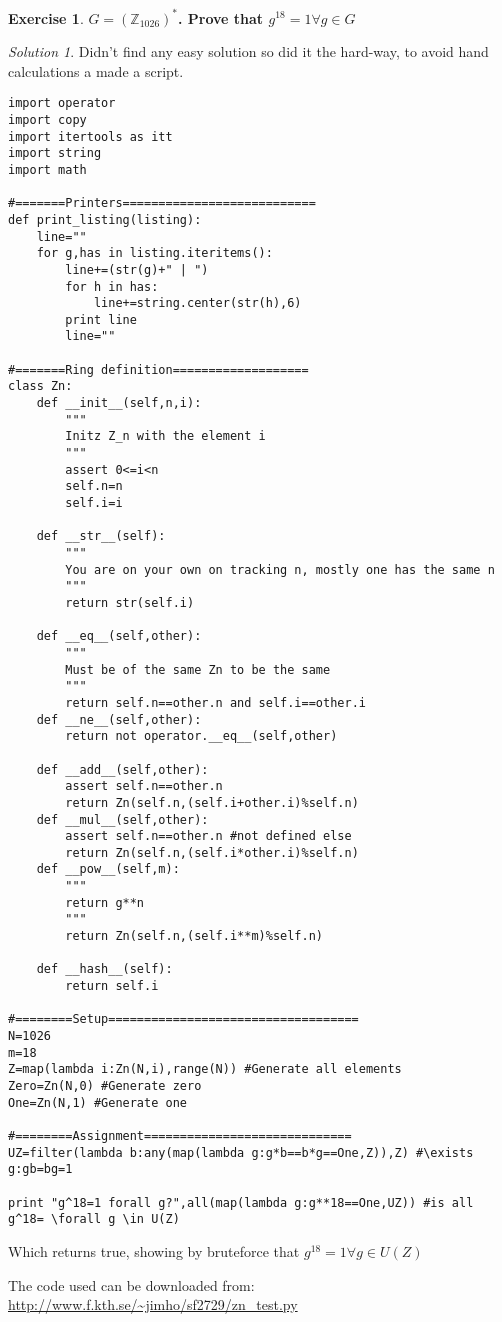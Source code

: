 \documentclass[a4paper,twoside=false,abstract=false,numbers=noenddot,
titlepage=false,headings=small,parskip=half,version=last]{scrartcl}
\theoremstyle{definition}
\newtheorem{exercise}{Exercise}
\theoremstyle{remark}
\newtheorem*{solution}{Solution}
\newcommand{\ZZ}{\ensuremath{\mathbb{Z}}}
\begin{document}
\begin{exercise}
{\bf
$G=(\ZZ_{1026})^*$. Prove that $g^{18}=1 \forall g \in G$
}
\end{exercise}
\begin{solution}

Didn't find any easy solution so did it the hard-way, to avoid hand
calculations a made a script.
\begin{verbatim}
import operator
import copy
import itertools as itt
import string
import math

#=======Printers===========================
def print_listing(listing):
    line=""
    for g,has in listing.iteritems():
        line+=(str(g)+" | ")
        for h in has:
            line+=string.center(str(h),6)
        print line
        line=""

#=======Ring definition===================
class Zn:
    def __init__(self,n,i):
        """
        Initz Z_n with the element i
        """
        assert 0<=i<n
        self.n=n
        self.i=i

    def __str__(self):
        """
        You are on your own on tracking n, mostly one has the same n
        """
        return str(self.i)

    def __eq__(self,other):
        """
        Must be of the same Zn to be the same
        """
        return self.n==other.n and self.i==other.i
    def __ne__(self,other):
        return not operator.__eq__(self,other)
    
    def __add__(self,other):
        assert self.n==other.n
        return Zn(self.n,(self.i+other.i)%self.n)
    def __mul__(self,other):
        assert self.n==other.n #not defined else
        return Zn(self.n,(self.i*other.i)%self.n)
    def __pow__(self,m):
        """
        return g**n
        """
        return Zn(self.n,(self.i**m)%self.n)
    
    def __hash__(self):
        return self.i

#========Setup===================================
N=1026
m=18
Z=map(lambda i:Zn(N,i),range(N)) #Generate all elements
Zero=Zn(N,0) #Generate zero
One=Zn(N,1) #Generate one

#========Assignment=============================
UZ=filter(lambda b:any(map(lambda g:g*b==b*g==One,Z)),Z) #\exists g:gb=bg=1

print "g^18=1 forall g?",all(map(lambda g:g**18==One,UZ)) #is all g^18= \forall g \in U(Z)
\end{verbatim}

Which returns true, showing by bruteforce that $g^{18}=1 \forall g \in U(Z)$

The code used can be downloaded from:\\
\url{http://www.f.kth.se/~jimho/sf2729/zn_test.py}

\end{solution}


\end{document}
